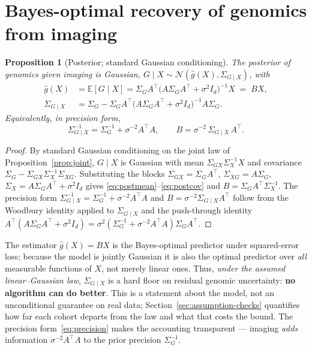 \documentclass{article}
\newtheorem{proposition}{Proposition}
\newcommand{\E}{\mathbb{E}}
\newcommand{\N}{\mathcal{N}}
\newcommand{\Sg}{\Sigma_{G}}
\newcommand{\Sx}{\Sigma_{X}}
\newcommand{\Sgx}{\Sigma_{GX}}
\newcommand{\Sxg}{\Sigma_{XG}}
\newcommand{\Sgcx}{\Sigma_{G\mid X}}
\newcommand{\T}{^{\top}}
\begin{document}
\section{Bayes-optimal recovery of genomics from imaging}
\label{sec:posterior}

\begin{proposition}[Posterior; standard Gaussian conditioning]
\label{prop:posterior}
The posterior of genomics given imaging is Gaussian, $G \mid X \sim \N(\hat g(X), \Sgcx)$, with
\begin{align}
\hat g(X) &= \E[G \mid X] = \Sg A\T \big(A \Sg A\T + \sigma^2 I_d\big)^{-1} X \;=\; B X, \label{eq:postmean}\\
\Sgcx &= \Sg - \Sg A\T \big(A \Sg A\T + \sigma^2 I_d\big)^{-1} A \Sg. \label{eq:postcov}
\end{align}
Equivalently, in precision form,
\begin{equation}
\Sgcx^{-1} = \Sg^{-1} + \sigma^{-2} A\T A,
\qquad
B = \sigma^{-2}\, \Sgcx\, A\T .
\label{eq:precision}
\end{equation}
\end{proposition}

\begin{proof}
By standard Gaussian conditioning on the joint law of
Proposition~\ref{prop:joint}, $G\mid X$ is Gaussian with mean
$\Sgx\Sx^{-1}X$ and covariance $\Sg-\Sgx\Sx^{-1}\Sxg$. Substituting the blocks
$\Sgx=\Sg A\T$, $\Sxg=A\Sg$, $\Sx=A\Sg A\T+\sigma^2 I_d$ gives
\eqref{eq:postmean}--\eqref{eq:postcov} and $B=\Sg A\T\Sx^{-1}$. The precision
form $\Sgcx^{-1}=\Sg^{-1}+\sigma^{-2}A\T A$ and $B=\sigma^{-2}\Sgcx A\T$ follow
from the Woodbury identity applied to $\Sgcx$ and the push-through identity
$A\T(A\Sg A\T+\sigma^2 I_d)=\sigma^2(\Sg^{-1}+\sigma^{-2}A\T A)\Sg A\T$.
\end{proof}

The estimator $\hat g(X) = BX$ is the Bayes-optimal predictor under squared-error
loss; because the model is jointly Gaussian it is also the optimal predictor over
\emph{all} measurable functions of $X$, not merely linear ones. Thus, \emph{under
the assumed linear--Gaussian law}, $\Sgcx$ is a hard floor on residual genomic
uncertainty: \textbf{no algorithm can do better}. This is a statement about the
model, not an unconditional guarantee on real data; Section~\ref{sec:assumption-checks}
quantifies how far each cohort departs from the law and what that costs the bound.
The precision form~\eqref{eq:precision} makes the accounting transparent ---
imaging \emph{adds} information $\sigma^{-2} A\T A$ to the prior precision
$\Sg^{-1}$.
\end{document}

